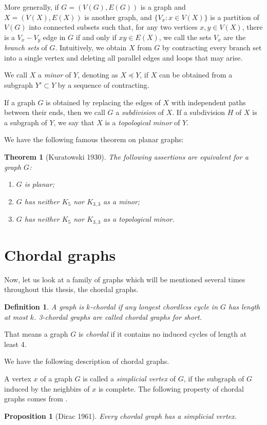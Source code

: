 \documentclass[12pt]{report}
\newtheorem{theorem}{Theorem}
\newtheorem{definition}{Definition}
\newtheorem{proposition}{Proposition}
\begin{document}
More generally, if $G=(V(G),E(G))$ is a graph and $X=(V(X),E(X))$ is another graph, and $\{V_x:x\in V(X)\}$ is a partition of $V(G)$ into connected subsets such that, for any two vertices $x,y\in V(X)$, there is a $V_x-V_y$ edge in $G$ if and only if $xy\in E(X)$, we call the sets $V_x$ are the {\em branch sets} of $G$. Intuitively, we obtain $X$ from $G$ by contracting every branch set into a single vertex and deleting all parallel edges and loops that may arise. 

We call $X$ a {\em minor} of $Y$, denoting as $X\preccurlyeq Y$, if $X$ can be obtained from a subgraph $Y'\subset Y$ by a sequence of contracting. 

If a graph $G$ is obtained by replacing the edges of $X$ with independent paths between their ends, then we call $G$ a {\em subdivision} of $X$. If a subdivision $H$ of $X$ is a subgraph of $Y$, we say that $X$ is a {\em topological minor} of $Y$.

We have the following famous theorem on planar graphs:
\begin{theorem}[Kuratowski 1930]\label{plgfodmthmku}
The following assertions are equivalent for a graph $G$:
\begin{enumerate}
\item $G$ is planar;
\item $G$ has neither $K_5$ nor $K_{3,3}$ as a minor;
\item $G$ has neither $K_5$ nor $K_{3,3}$ as a topological minor.
\end{enumerate}
\end{theorem}




\section{Chordal graphs}

Now, let us look at a family of graphs which will be mentioned several times throughout this thesis, the chordal graphs.

\begin{definition}\label{defchor}
A graph is $k$-chordal if any longest chordless cycle in $G$ has length at most $k$. 3-chordal graphs are called chordal graphs for short.
\end{definition}
That means a graph $G$ is {\em chordal} if it contains no induced cycles of length at least 4.

We have the following description of chordal graphs.

A vertex $x$ of a graph $G$ is called a {\em simplicial vertex} of $G$, if the subgraph of $G$ induced by the neighbirs of $x$ is complete.
The following property of chordal graphs comes from \cite{dirac1961rigid}.
\begin{proposition}[Dirac 1961]\label{pdir61}
Every chordal graph has a simplicial vertex.
\end{proposition}
\end{document}
